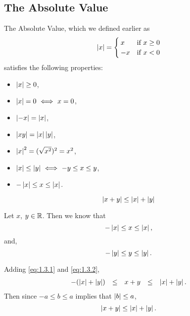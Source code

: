 \documentclass[12pt]{article}
\theoremstyle{definition}
\renewenvironment{proof}[1][\proofname]{\vspace{-10pt}\begin{replacementproof}}{\end{replacementproof}}
\begin{document}
    \subsection{The Absolute Value}
    The Absolute Value, which we defined earlier as 
    \begin{equation*}
        \left|x\right| = \begin{cases}
            x & \mbox{if} ~ x \geq 0 \\
            -x & \mbox{if} ~ x < 0
        \end{cases}
    \end{equation*}
    satisfies the following properties:
    \begin{itemize}
        \item $\left|x\right| \geq 0$,
        \item $\left|x\right| = 0 ~ \Longleftrightarrow ~ x = 0$,
        \item $\left|-x\right| = \left|x\right|$,
        \item $\left|xy\right| = \left|x\right|\left|y\right|$,
        \item $\left|x\right|^{2} = (\sqrt{x^{2}})^{2} = x^{2}$,
        \item $\left|x\right| \leq \left|y\right| ~ \Longleftrightarrow ~ -y \leq x \leq y$,
        \item $-\left|x\right| \leq x \leq \left|x\right|$.
    \end{itemize}

    \begin{prop}
        \begin{equation*}
            \left|x + y\right| \leq \left|x\right| + \left|y\right|
        \end{equation*}
    \end{prop}
    \begin{proof}
        Let $x$, $y \in \R$. Then we know that
        \begin{equation}
            -\left|x\right| \leq x \leq \left|x\right|, \label{eq:1.3.1}
        \end{equation} 
        and,
        \begin{equation}
            -\left|y\right| \leq y \leq \left|y\right|. \label{eq:1.3.2}   
        \end{equation}

        Adding \eqref{eq:1.3.1} and \eqref{eq:1.3.2},
        \begin{equation*}
            \begin{array}{rcccl}
                -(\left|x\right| + \left|y\right|) & \leq & x + y & \leq &\left|x\right| + \left|y\right|. \\
            \end{array}
        \end{equation*}
        Then since $-a \leq b \leq a$ implies that $\left|b\right| \leq a$,
        \begin{equation*}
            \left|x + y\right| \leq \left|x\right| + \left|y\right|.
        \end{equation*}
    \end{proof}
\end{document}
